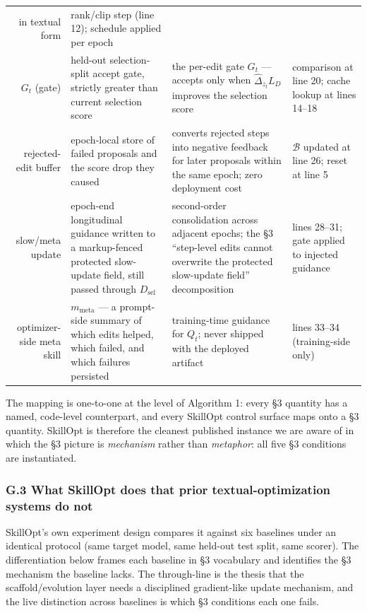 \documentclass[
]{article}
\begin{document}
{\begin{longtable}[]
{rate} in textual form & rank/clip step (line 12); schedule applied per
epoch \\
\(G_t\) (gate) & held-out selection-split accept gate, strictly greater
than current selection score & the per-edit gate \(G_t\) --- accepts
only when \(\widehat{\Delta}_{z_t} L_D\) improves the selection score &
comparison at line 20; cache lookup at lines 14--18 \\
rejected-edit buffer & epoch-local store of failed proposals and the
score drop they caused & converts rejected steps into negative feedback
for later proposals within the same epoch; zero deployment cost &
\(\mathcal B\) updated at line 26; reset at line 5 \\
slow/meta update & epoch-end longitudinal guidance written to a
markup-fenced protected slow-update field, still passed through
\(D_{\text{sel}}\) & second-order consolidation across adjacent epochs;
the §3 ``step-level edits cannot overwrite the protected slow-update
field'' decomposition & lines 28--31; gate applied to injected
guidance \\
optimizer-side meta skill & \(m_{\text{meta}}\) --- a prompt-side
summary of which edits helped, which failed, and which failures
persisted & training-time guidance for \(Q_t\); never shipped with the
deployed artifact & lines 33--34 (training-side only) \\
\end{longtable}
}

The mapping is one-to-one at the level of Algorithm 1: every §3 quantity
has a named, code-level counterpart, and every SkillOpt control surface
maps onto a §3 quantity. SkillOpt is therefore the cleanest published
instance we are aware of in which the §3 picture is \emph{mechanism}
rather than \emph{metaphor}: all five §3 conditions are instantiated.

\subsubsection{G.3 What SkillOpt does that prior textual-optimization
systems do
not}\label{g.3-what-skillopt-does-that-prior-textual-optimization-systems-do-not}

SkillOpt's own experiment design compares it against six baselines under
an identical protocol (same target model, same held-out test split, same
scorer). The differentiation below frames each baseline in §3 vocabulary
and identifies the §3 mechanism the baseline lacks. The through-line is
the thesis that the scaffold/evolution layer needs a disciplined
gradient-like update mechanism, and the live distinction across
baselines is which §3 conditions each one fails.
\end{document}
